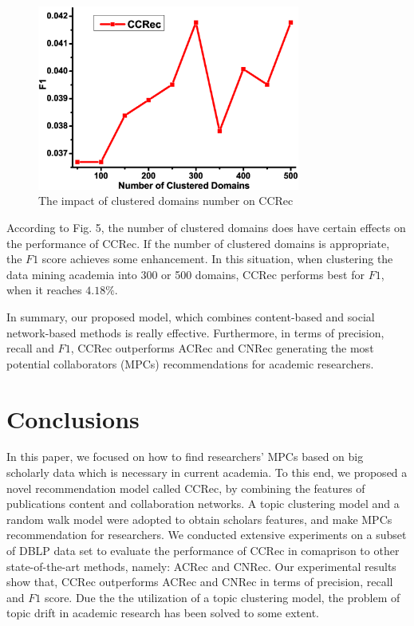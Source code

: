 \documentclass[review]{elsarticle}
\begin{document}
\begin{figure}
\centering
\includegraphics [width=3.4in]{Fig6.eps}
\caption{The impact of clustered domains number on CCRec}
\end{figure}

According to Fig. 5, the number of clustered domains does have certain effects on the performance of CCRec. If the number of clustered domains is appropriate, the $F1$ score achieves some enhancement. In this situation, when clustering the data mining academia into 300 or 500 domains, CCRec performs best for $F1$, when it reaches $4.18\%$.

In summary, our proposed model, which combines content-based and social network-based methods is really effective. Furthermore, in terms of precision, recall and $F1$, CCRec outperforms ACRec and CNRec generating the most potential collaborators (MPCs) recommendations for academic researchers.
\section{Conclusions}
In this paper, we focused on how to find researchers' MPCs based on big scholarly data which is necessary in current academia. To this end, we proposed a novel recommendation model called CCRec, by combining the features of publications content and collaboration networks. A topic clustering model and a random walk model were adopted to obtain scholars features, and make MPCs recommendation for researchers. We conducted extensive experiments on a subset of DBLP data set to evaluate the performance of CCRec in comaprison to other state-of-the-art methods, namely: ACRec and CNRec. Our experimental results show that, CCRec outperforms ACRec and CNRec in terms of precision, recall and $F1$ score. Due the the utilization of a topic clustering model, the problem of topic drift in academic research has been solved to some extent.
\end{document}
